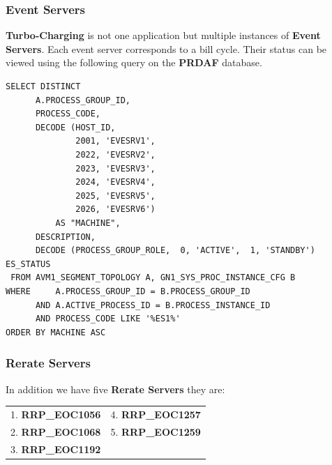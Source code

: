 \documentclass[12pt,twoside]{article}
\begin{document}
\subsubsection{Event Servers}
\label{sec:orgheadline3}
\textbf{Turbo-Charging} is not one application but multiple instances of \textbf{Event Servers}. Each event server corresponds to a bill cycle. Their status can be viewed using
  the following query on the \textbf{PRDAF} database.
\begin{verbatim}
SELECT DISTINCT
      A.PROCESS_GROUP_ID,
      PROCESS_CODE,
      DECODE (HOST_ID,
              2001, 'EVESRV1',
              2022, 'EVESRV2',
              2023, 'EVESRV3',
              2024, 'EVESRV4',
              2025, 'EVESRV5',
              2026, 'EVESRV6')
          AS "MACHINE",
      DESCRIPTION,
      DECODE (PROCESS_GROUP_ROLE,  0, 'ACTIVE',  1, 'STANDBY') ES_STATUS
 FROM AVM1_SEGMENT_TOPOLOGY A, GN1_SYS_PROC_INSTANCE_CFG B
WHERE     A.PROCESS_GROUP_ID = B.PROCESS_GROUP_ID
      AND A.ACTIVE_PROCESS_ID = B.PROCESS_INSTANCE_ID
      AND PROCESS_CODE LIKE '%ES1%'
ORDER BY MACHINE ASC
\end{verbatim}
\subsubsection{Rerate Servers}
\label{sec:orgheadline4}
In addition we have five \textbf{Rerate Servers} they are:
\begin{center}
\begin{tabular}{ll}
1. \textbf{RRP\_EOC1056} & 4. \textbf{RRP\_EOC1257}\\
2. \textbf{RRP\_EOC1068} & 5. \textbf{RRP\_EOC1259}\\
3. \textbf{RRP\_EOC1192} & \\
\end{tabular}
\end{center}
\end{document}
